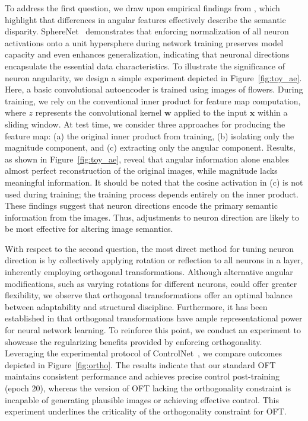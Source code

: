 To address the first question, we draw upon empirical findings from \cite{liu2018decoupled,chen2020angular}, which highlight that differences in angular features effectively describe the semantic disparity. SphereNet~\cite{liu2017deep} demonstrates that enforcing normalization of all neuron activations onto a unit hypersphere during network training preserves model capacity and even enhances generalization, indicating that neuronal directions encapsulate the essential data characteristics. To illustrate the significance of neuron angularity, we design a simple experiment depicted in Figure~\ref{fig:toy_ae}. Here, a basic convolutional autoencoder is trained using images of flowers. During training, we rely on the conventional inner product for feature map computation, where $z$ represents the convolutional kernel $\bm{w}$ applied to the input $\bm{x}$ within a sliding window. At test time, we consider three approaches for producing the feature map: (a) the original inner product from training, (b) isolating only the magnitude component, and (c) extracting only the angular component. Results, as shown in Figure~\ref{fig:toy_ae}, reveal that angular information alone enables almost perfect reconstruction of the original images, while magnitude lacks meaningful information. It should be noted that the cosine activation in (c) is not used during training; the training process depends entirely on the inner product. These findings suggest that neuron directions encode the primary semantic information from the images. Thus, adjustments to neuron direction are likely to be most effective for altering image semantics.

With respect to the second question, the most direct method for tuning neuron direction is by collectively applying rotation or reflection to all neurons in a layer, inherently employing orthogonal transformations. Although alternative angular modifications, such as varying rotations for different neurons, could offer greater flexibility, we observe that orthogonal transformations offer an optimal balance between adaptability and structural discipline. Furthermore, it has been established in \cite{liu2021orthogonal} that orthogonal transformations have ample representational power for neural network learning. To reinforce this point, we conduct an experiment to showcase the regularizing benefits provided by enforcing orthogonality. Leveraging the experimental protocol of ControlNet~\cite{zhang2023adding}, we compare outcomes depicted in Figure~\ref{fig:ortho}. The results indicate that our standard OFT maintains consistent performance and achieves precise control post-training (epoch 20), whereas the version of OFT lacking the orthogonality constraint is incapable of generating plausible images or achieving effective control. This experiment underlines the criticality of the orthogonality constraint for OFT.

